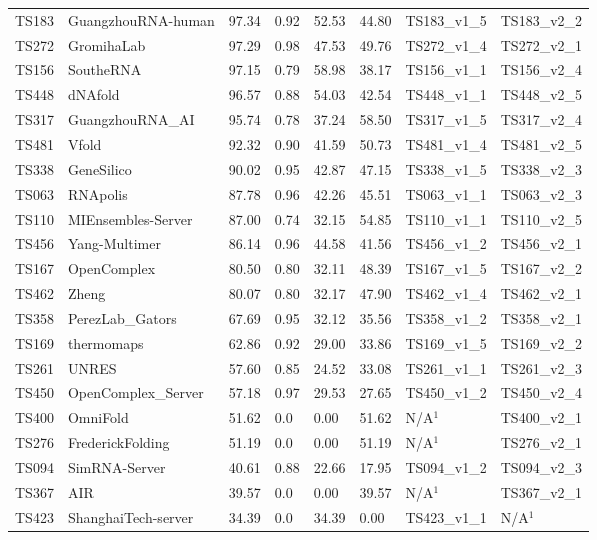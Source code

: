 \begin{table}[ht]
{\begin{tabular}{llllllll}
TS183 & GuangzhouRNA-human & 97.34 & 0.92 & 52.53 & 44.80 & TS183\_v1\_5 & TS183\_v2\_2 \\ 
TS272 & GromihaLab & 97.29 & 0.98 & 47.53 & 49.76 & TS272\_v1\_4 & TS272\_v2\_1 \\ 
TS156 & SoutheRNA & 97.15 & 0.79 & 58.98 & 38.17 & TS156\_v1\_1 & TS156\_v2\_4 \\ 
TS448 & dNAfold & 96.57 & 0.88 & 54.03 & 42.54 & TS448\_v1\_1 & TS448\_v2\_5 \\ 
TS317 & GuangzhouRNA\_AI & 95.74 & 0.78 & 37.24 & 58.50 & TS317\_v1\_5 & TS317\_v2\_4 \\ 
TS481 & Vfold & 92.32 & 0.90 & 41.59 & 50.73 & TS481\_v1\_4 & TS481\_v2\_5 \\ 
TS338 & GeneSilico & 90.02 & 0.95 & 42.87 & 47.15 & TS338\_v1\_5 & TS338\_v2\_3 \\ 
TS063 & RNApolis & 87.78 & 0.96 & 42.26 & 45.51 & TS063\_v1\_1 & TS063\_v2\_3 \\ 
TS110 & MIEnsembles-Server & 87.00 & 0.74 & 32.15 & 54.85 & TS110\_v1\_1 & TS110\_v2\_5 \\ 
TS456 & Yang-Multimer & 86.14 & 0.96 & 44.58 & 41.56 & TS456\_v1\_2 & TS456\_v2\_1 \\ 
TS167 & OpenComplex & 80.50 & 0.80 & 32.11 & 48.39 & TS167\_v1\_5 & TS167\_v2\_2 \\ 
TS462 & Zheng & 80.07 & 0.80 & 32.17 & 47.90 & TS462\_v1\_4 & TS462\_v2\_1 \\ 
TS358 & PerezLab\_Gators & 67.69 & 0.95 & 32.12 & 35.56 & TS358\_v1\_2 & TS358\_v2\_1 \\ 
TS169 & thermomaps & 62.86 & 0.92 & 29.00 & 33.86 & TS169\_v1\_5 & TS169\_v2\_2 \\ 
TS261 & UNRES & 57.60 & 0.85 & 24.52 & 33.08 & TS261\_v1\_1 & TS261\_v2\_3 \\ 
TS450 & OpenComplex\_Server & 57.18 & 0.97 & 29.53 & 27.65 & TS450\_v1\_2 & TS450\_v2\_4 \\ 
TS400 & OmniFold & 51.62 & 0.0 & 0.00 & 51.62 & N/A$^{1}$ & TS400\_v2\_1 \\ 
TS276 & FrederickFolding & 51.19 & 0.0 & 0.00 & 51.19 & N/A$^{1}$ & TS276\_v2\_1 \\ 
TS094 & SimRNA-Server & 40.61 & 0.88 & 22.66 & 17.95 & TS094\_v1\_2 & TS094\_v2\_3 \\ 
TS367 & AIR & 39.57 & 0.0 & 0.00 & 39.57 & N/A$^{1}$ & TS367\_v2\_1 \\ 
TS423 & ShanghaiTech-server & 34.39 & 0.0 & 34.39 & 0.00 & TS423\_v1\_1 & N/A$^{1}$ \\ 

\end{tabular}}
\end{table}
